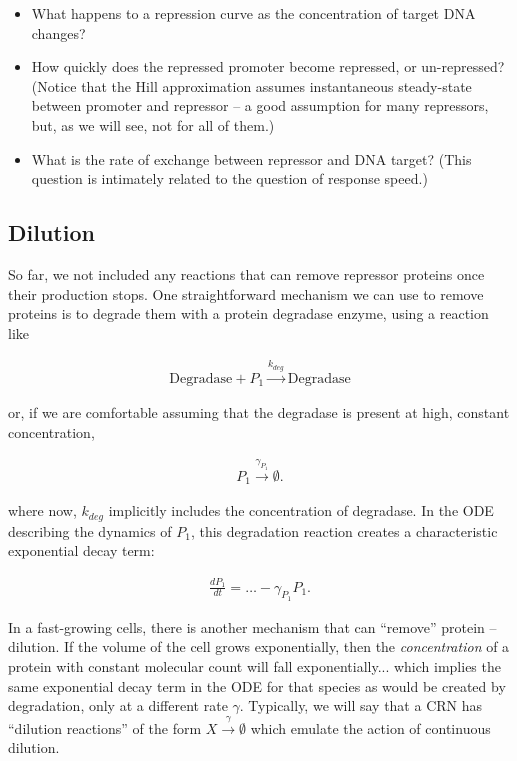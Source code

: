 \documentclass[preprint,12pt]{elsarticle}
\begin{document}
\begin{itemize}
	\item What happens to a repression curve as the concentration of target DNA changes?
	\item How quickly does the repressed promoter become repressed, or un-repressed? (Notice that the Hill approximation assumes instantaneous steady-state between promoter and repressor -- a good assumption for many repressors, but, as we will see, not for all of them.)
	\item What is the rate of exchange between repressor and DNA target? (This question is intimately related to the question of response speed.)
\end{itemize}

\subsection{Dilution}

So far, we not included any reactions that can remove repressor proteins once their production stops. One straightforward mechanism we can use to remove proteins is to degrade them with a protein degradase enzyme, using a reaction like 

\begin{align}\label{eq:deg1}
	\text{Degradase} + P_1 \xrightarrow{k_{deg}} \text{Degradase}
\end{align}

or, if we are comfortable assuming that the degradase is present at high, constant concentration,

\begin{align}\label{eq:deg2}
	P_1 \xrightarrow{\gamma_{P_1}} \emptyset.
\end{align}

where now, $k_{deg}$ implicitly includes the concentration of degradase. In the ODE describing the dynamics of $P_1$, this degradation reaction creates a characteristic exponential decay term:

\begin{align}
	\frac{dP_1}{dt} = \hdots - \gamma_{P_1}P_1.
\end{align}

In a fast-growing cells, there is another mechanism that can ``remove'' protein -- dilution. If the volume of the cell grows exponentially, then the \emph{concentration} of a protein with constant molecular count will fall exponentially... which implies the same exponential decay term in the ODE for that species as would be created by degradation, only at a different rate $\gamma$. Typically, we will say that a CRN has ``dilution reactions'' of the form $X \xrightarrow{\gamma} \emptyset$ which emulate the action of continuous dilution.
\end{document}
